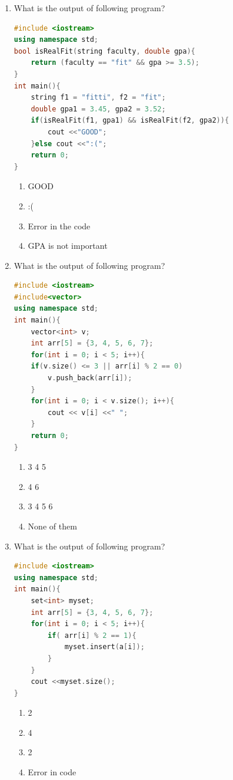 \documentclass[10pt]{article}
\begin{document}
\begin{enumerate}
\item What is the output of following program?
\begin{lstlisting}[language=C++]
#include <iostream>
using namespace std;
bool isRealFit(string faculty, double gpa){
    return (faculty == "fit" && gpa >= 3.5);
}
int main(){
    string f1 = "fitti", f2 = "fit";
    double gpa1 = 3.45, gpa2 = 3.52;
    if(isRealFit(f1, gpa1) && isRealFit(f2, gpa2)){
        cout <<"GOOD";
    }else cout <<":(";
    return 0;
}
\end{lstlisting}
\begin{multicols}{4}
\begin{enumerate}
    \item GOOD
    \item :( 
    \item Error in the code
    \item GPA is not important
\end{enumerate}
\end{multicols}



\item What is the output of following program?
\begin{lstlisting}[language=C++]
#include <iostream>
#include<vector>
using namespace std;
int main(){
    vector<int> v;
    int arr[5] = {3, 4, 5, 6, 7};
    for(int i = 0; i < 5; i++){
    if(v.size() <= 3 || arr[i] % 2 == 0)
        v.push_back(arr[i]);
    }
    for(int i = 0; i < v.size(); i++){
        cout << v[i] <<" ";
    }
    return 0;
}
\end{lstlisting}
\begin{multicols}{4}
\begin{enumerate}
    \item 3 4 5
    \item 4 6
    \item 3 4 5 6 
    \item None of them
\end{enumerate}
\end{multicols}



\item What is the output of following program?
\begin{lstlisting}[language=C++]
#include <iostream>
using namespace std;
int main(){
    set<int> myset;
    int arr[5] = {3, 4, 5, 6, 7};
    for(int i = 0; i < 5; i++){
        if( arr[i] % 2 == 1){
            myset.insert(a[i]);
        }
    }
    cout <<myset.size();
}
\end{lstlisting}
\begin{multicols}{4}
\begin{enumerate}
    \item 2
    \item 4
    \item 2
    \item Error in code 
\end{enumerate}
\end{multicols}





\end{enumerate}
\end{document}
